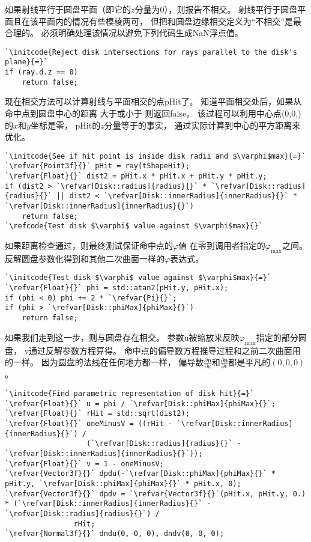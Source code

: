如果射线平行于圆盘平面（即它的$z$分量为0），则报告不相交。
射线平行于圆盘平面且在该平面内的情况有些模棱两可，
但把和圆盘边缘相交定义为“不相交”是最合理的。
必须明确处理该情况以避免下列代码生成NaN浮点值。
\begin{lstlisting}
`\initcode{Reject disk intersections for rays parallel to the disk's plane}{=}`
if (ray.d.z == 0)
    return false;
\end{lstlisting}

现在相交方法可以计算射线与平面相交的点{\ttfamily pHit}了。
知道平面相交处后，如果从命中点到圆盘中心的距离
大于或小于
则返回{\ttfamily false}。
该过程可以利用中心点{\ttfamily (0,0,)}的$x$和$y$坐标是零，
{\ttfamily pHit}的$z$分量等于的事实，
通过实际计算到中心的平方距离来优化。
\begin{lstlisting}
`\initcode{See if hit point is inside disk radii and $\varphi$max}{=}`
`\refvar{Point3f}{}` pHit = ray(tShapeHit);
`\refvar{Float}{}` dist2 = pHit.x * pHit.x + pHit.y * pHit.y;
if (dist2 > `\refvar[Disk::radius]{radius}{}` * `\refvar[Disk::radius]{radius}{}` || dist2 < `\refvar[Disk::innerRadius]{innerRadius}{}` * `\refvar[Disk::innerRadius]{innerRadius}{}`)
    return false;
`\refcode{Test disk $\varphi$ value against $\varphi$max}{}`
\end{lstlisting}

如果距离检查通过，则最终测试保证命中点的$\varphi$值
在零到调用者指定的$\varphi_{\max}$之间。
反解圆盘参数化得到和其他二次曲面一样的$\varphi$表达式。
\begin{lstlisting}
`\initcode{Test disk $\varphi$ value against $\varphi$max}{=}`
`\refvar{Float}{}` phi = std::atan2(pHit.y, pHit.x);
if (phi < 0) phi += 2 * `\refvar{Pi}{}`;
if (phi > `\refvar[Disk::phiMax]{phiMax}{}`)
    return false;
\end{lstlisting}

如果我们走到这一步，则与圆盘存在相交。
参数{\ttfamily u}被缩放来反映$\varphi_{\max}$指定的部分圆盘，
{\ttfamily v}通过反解参数方程算得。
命中点的偏导数方程推导过程和之前二次曲面用的一样。
因为圆盘的法线在任何地方都一样，
偏导数$\displaystyle\frac{\partial\bm n}{\partial u}$和$\displaystyle\frac{\partial\bm n}{\partial v}$都是平凡的$(0,0,0)$。
\begin{lstlisting}
`\initcode{Find parametric representation of disk hit}{=}`
`\refvar{Float}{}` u = phi / `\refvar[Disk::phiMax]{phiMax}{}`;
`\refvar{Float}{}` rHit = std::sqrt(dist2);
`\refvar{Float}{}` oneMinusV = ((rHit - `\refvar[Disk::innerRadius]{innerRadius}{}`) /
                   (`\refvar[Disk::radius]{radius}{}` - `\refvar[Disk::innerRadius]{innerRadius}{}`));
`\refvar{Float}{}` v = 1 - oneMinusV;
`\refvar{Vector3f}{}` dpdu(-`\refvar[Disk::phiMax]{phiMax}{}` * pHit.y, `\refvar[Disk::phiMax]{phiMax}{}` * pHit.x, 0);
`\refvar{Vector3f}{}` dpdv = `\refvar{Vector3f}{}`(pHit.x, pHit.y, 0.) * (`\refvar[Disk::innerRadius]{innerRadius}{}` - `\refvar[Disk::radius]{radius}{}`) /
                rHit;
`\refvar{Normal3f}{}` dndu(0, 0, 0), dndv(0, 0, 0);
\end{lstlisting}

